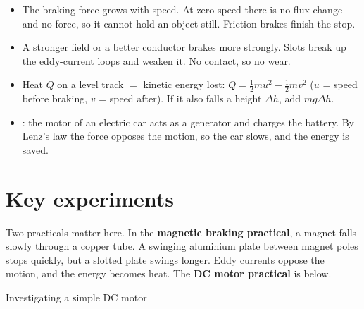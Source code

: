 \begin{itemize}
  \item The braking force grows with speed. At zero speed there is no flux change and no
        force, so it cannot hold an object still. Friction brakes finish the stop.
  \item A stronger field or a better conductor brakes more strongly. Slots break up the
        eddy-current loops and weaken it. No contact, so no wear.
  \item Heat $Q$ on a level track $=$ kinetic energy lost:
        $Q = \tfrac{1}{2}mu^2 - \tfrac{1}{2}mv^2$ ($u$ = speed before braking, $v$ = speed
        after). If it also falls a height $\Delta h$, add $mg\Delta h$.
  \item {}: the motor of an electric car acts as a generator
        and charges the battery. By Lenz's law the force opposes the motion, so the car
        slows, and the energy is saved.
\end{itemize}

\section{Key experiments}\label{ch5:sec:experiments}

Two practicals matter here. In the \textbf{magnetic braking practical}, a magnet falls
slowly through a copper tube. A swinging aluminium plate between magnet poles stops
quickly, but a slotted plate swings longer. Eddy currents oppose the motion, and the
energy becomes heat. The \textbf{DC motor practical} is below.

\begin{experiment}[unbreakable]{Investigating a simple DC motor}
\end{experiment}

